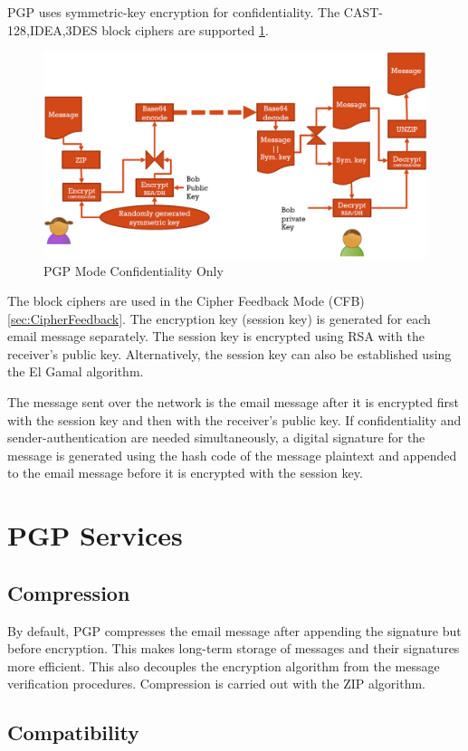 PGP uses symmetric-key encryption for confidentiality. The CAST-128,IDEA,3DES block ciphers are supported \ref{fig:pgp-confidentiality}.

\begin{figure}
	\centering
	\includegraphics[width=0.7\linewidth]{Images/Chapter7/pgp-confidentiality}
	\caption{PGP Mode Confidentiality Only}
	\label{fig:pgp-confidentiality}
\end{figure}

The block ciphers are used in the Cipher Feedback Mode (CFB) \ref{sec:CipherFeedback}. The encryption key (session key) is generated for each email message separately. The session key is encrypted using RSA with the receiver's public key. Alternatively, the session key can also be established using the El Gamal algorithm. 

The message sent over the network is the email message after it is encrypted first with the session key and then with the receiver's public key. If confidentiality and sender-authentication are needed simultaneously, a digital signature for the message is generated using the hash code of the message plaintext and appended to the email message before it is encrypted with the session key.

\section{PGP Services}
\subsection{Compression}

By default, PGP compresses the email message after appending the signature but before encryption. This makes long-term storage of messages and their signatures more efficient. This also decouples the encryption algorithm from the message verification procedures. Compression is carried out with the ZIP algorithm.

\subsection{Compatibility}

